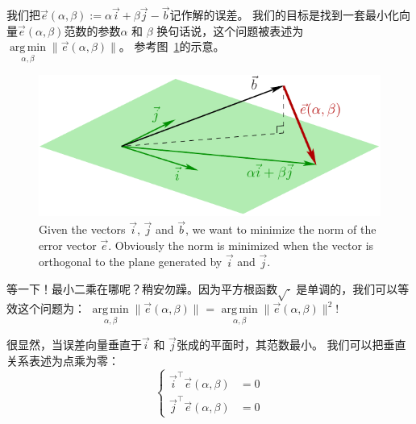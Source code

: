 \documentclass[notitlepage,oneside]{book}
\DeclareMathOperator*{\argmin}{arg\,min}
\begin{document}
我们把$\vec{e}(\alpha, \beta) :=  \alpha \vec{i} + \beta\vec{j} - \vec b$记作解的误差。
我们的目标是找到一套最小化向量$\vec{e}(\alpha, \beta)$范数的参数$\alpha$ 和 $\beta$
换句话说，这个问题被表述为 $\argmin\limits_{\alpha, \beta} \|\vec{e}(\alpha, \beta)\|$。
参考图~\ref{fig:error}的示意。

\begin{figure}[ht]
	\centering
	\includegraphics[width=.7\linewidth]{img/error.pdf}
	\caption{Given the vectors $\vec i$, $\vec j$ and $\vec b$, we want to minimize the norm of the error vector $\vec e$. 
    Obviously the norm is minimized when the vector is orthogonal to the plane generated by $\vec i$ and $\vec j$.}
	\label{fig:error}
\end{figure}

等一下！最小二乘在哪呢？稍安勿躁。因为平方根函数$\sqrt{\cdot}$ 是单调的，我们可以等效这个问题为：
$\argmin\limits_{\alpha, \beta} \|\vec{e}(\alpha, \beta)\|$ = $\argmin\limits_{\alpha, \beta} \|\vec{e}(\alpha, \beta)\|^2$!

很显然，当误差向量垂直于$\vec i$ 和 $\vec j$张成的平面时，其范数最小。
我们可以把垂直关系表述为点乘为零：
$$
\left\{
\begin{split}\vec{i}^\top \vec{e}(\alpha, \beta) &= 0\\
\vec{j}^\top \vec{e}(\alpha, \beta) &= 0
\end{split}
\right.
$$
\end{document}
